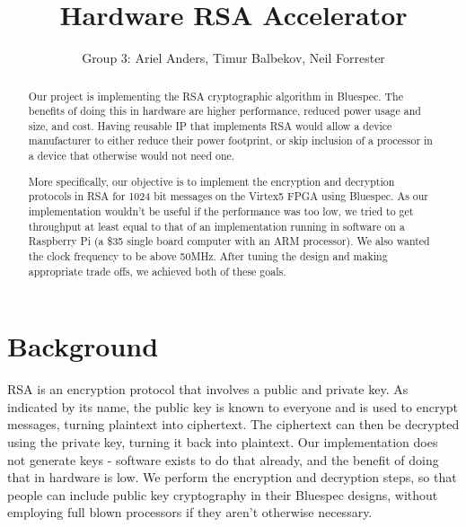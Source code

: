 \documentclass[a4paper,11pt]{report}
\title{Hardware RSA Accelerator}
\author{Group 3: Ariel Anders, Timur Balbekov, Neil Forrester}
\begin{document}
\maketitle
\tableofcontents

\begin{abstract}
Our project is implementing the RSA cryptographic algorithm in Bluespec.
The benefits of doing this in hardware are higher performance, reduced power usage and size, and cost.
Having reusable IP that implements RSA would allow a device manufacturer to either reduce their
power footprint, or skip inclusion of a processor in a device that otherwise would not need one.  

More specifically, our objective is to implement the encryption and decryption protocols in RSA for 1024 bit messages on the Virtex5 FPGA using Bluespec.
As our implementation wouldn't be useful if the performance was too low, we tried to get throughput at least equal to that
of an implementation running in software on a Raspberry Pi (a \$35 single board computer with an ARM processor).
We also wanted the clock frequency to be above 50MHz.
After tuning the design and making appropriate trade offs, we achieved both of these goals.
\end{abstract}
\chapter{Background}


RSA is an encryption protocol that involves a public and private key.
As indicated by its name, the public key is known to everyone and is used to encrypt messages, turning plaintext into ciphertext.
The ciphertext can then be decrypted using the private key, turning it back into plaintext.
Our implementation does not generate keys - software exists to do that already, and the benefit of doing that in hardware is low.
We perform the encryption and decryption steps, so that people can include public key cryptography in their Bluespec designs,
without employing full blown processors if they aren't otherwise necessary.
\end{document}
